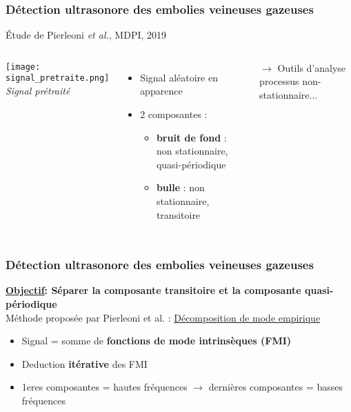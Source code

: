 \documentclass{beamer}
\begin{document}
\begin{frame}
\frametitle{Détection ultrasonore des embolies veineuses gazeuses}
\'Etude de Pierleoni \textit{et al.}, MDPI, 2019

\begin{columns}
\column{60mm}
\begin{center}
\texttt{[image: signal\_pretraite.png]}\\
\textit{\footnotesize Signal prétraité}
\end{center}

\column{60mm}
\begin{itemize}
\item Signal aléatoire en apparence
\vspace{0.2cm} 
\item 2 composantes :
\vspace{0.1cm}
\begin{itemize}
\item \textbf{bruit de fond} : non stationnaire, quasi-périodique
\vspace{0.1cm}
\item \textbf{bulle} : non stationnaire, transitoire
\vspace{0.1cm}
\end{itemize}
\end{itemize}
\vspace{0.2cm}
$\rightarrow$ Outils d'analyse processus non-stationnaire... 
\end{columns}

\end{frame}

\begin{frame}
\frametitle{Détection ultrasonore des embolies veineuses gazeuses}

\textbf{\underline{Objectif}: Séparer la composante transitoire et la composante quasi-périodique}\\

\vspace{0.5cm}
Méthode proposée par Pierleoni et al. : \underline{Décomposition de mode empirique}
\vspace{0.2cm}
\begin{itemize}
\item Signal = somme de \textbf{fonctions de mode intrinsèques (FMI)}
\vspace{0.2cm}
\item Deduction \textbf{itérative} des FMI 
\vspace{0.2cm}
\item 1eres composantes = hautes fréquences $\rightarrow$ dernières composantes = basses fréquences

\end{itemize}

\end{frame}
\end{document}
